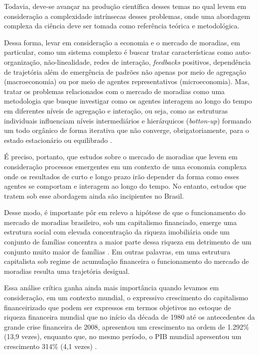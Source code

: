 Todavia, deve-se avançar na produção científica desses temas no qual levem em consideração a complexidade intrínsecas desses problemas, onde uma abordagem complexa da ciência deve ser tomada como referência teórica e metodológica.

Dessa forma, levar em consideração a economia e o mercado de moradias, em particular, como um sistema complexo é buscar tratar características como auto-organização, não-linealidade, redes de interação, \textit{feedbacks} positivos, dependência de trajetória além de emergência de padrões não apenas por meio de agregação (macroeconomia) ou por meio de agentes representativos (microeconomia). Mas, tratar os problemas relacionados com o mercado de moradias como uma metodologia que busque investigar como os agentes interagem ao longo do tempo em diferentes níveis de agregação e interação, ou seja, como as estruturas individuais influenciam níveis intermediários e hierárquicos (\textit{botton-up}) formando um todo orgânico de forma iterativa que não converge, obrigatoriamente, para o estado estacionário ou equilibrado \cite{2006TesfatsionJudd}.

É preciso, portanto, que estudos sobre o mercado de moradias que levem em consideração processos emergentes em um contexto de uma economia complexa onde os resultados de curto e longo prazo irão depender da forma como esses agentes se comportam  e interagem ao longo do tempo. No entanto, estudos que tratem sob esse abordagem ainda são incipientes no Brasil.

Desse modo, é importante pôr em relevo a hipótese de que o funcionamento do mercado de moradias brasileiro, sob um capitalismo financiado, emerge uma estrutura social com elevada concentração da riqueza imobiliária onde um conjunto de famílias concentra a maior parte dessa riqueza em detrimento de um conjunto muito maior de famílias \cite{AALBERS2015}. Em outras palavras, em uma estrutura capitalista sob regime de acumulação financeira \cite{Aglietta2004financeirizacao, Orlean2006financeirizacao} o funcionamento do mercado de moradias resulta uma trajetória desigual.

Essa análise crítica ganha ainda mais importância quando levamos em consideração, em um contexto mundial, o expressivo crescimento do capitalismo financeirizado que podem ser expressos em termos objetivos no estoque de riqueza financeira mundial que no início da década de 1980 até os antecedentes da grande crise financeira de 2008, apresentou um crescimento na ordem de 1.292\% (13,9 vezes), enquanto que, no mesmo período, o PIB mundial apresentou um crescimento 314\% (4,1 vezes) \cite{Paulani2009a}.

